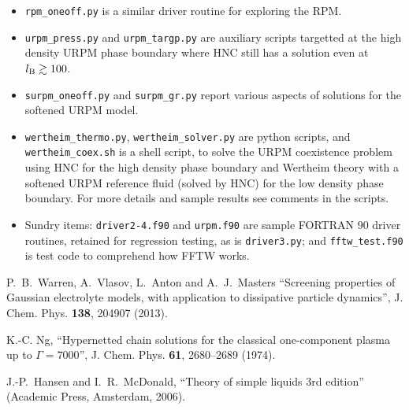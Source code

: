 \documentclass[12pt,a4paper]{article}
\begin{document}
\begin{itemize}
  (URPM) \cite{WVA+13}, including the possibility of a neutral solvent
  species.  The first routine can be used for one-off calculations of
  structure and thermodynamics at a chosen state point.  The second
  routine is intended to scan a range of densities to zero in on the
  Kirkwood transition between pure exponential and damped oscillatory
  behaviour in the tails of the total correlation functions.  Both
  routines are fully provided with command line options and sensible
  defaults, via the \verb+argparse+ module.  To see the available
  options use \verb+--help+.  The option \verb+--ncomp+ selects
  between the pure URPM case (\verb+--ncomp=2+, default) and the
  solvated URPM case (\verb+--ncomp=3+).
%
\item\verb+rpm_oneoff.py+ is a similar driver routine for exploring
  the RPM.
%
\item\verb+urpm_press.py+ and \verb+urpm_targp.py+ are auxiliary
  scripts targetted at the high density URPM phase boundary where HNC
  still has a solution even at $l_{\mathrm{B}}\gtrsim100$.
%
\item\verb+surpm_oneoff.py+ and \verb+surpm_gr.py+ report various
  aspects of solutions for the softened URPM model. 
%
\item\verb+wertheim_thermo.py+, \verb+wertheim_solver.py+ are python
  scripts, and \verb+wertheim_coex.sh+ is a shell script, to solve the
  URPM coexistence problem using HNC for the high density phase
  boundary and Wertheim theory with a softened URPM reference fluid
  (solved by HNC) for the low density phase boundary.  For more
  details and sample results see comments in the scripts.
%
\item Sundry items: \verb+driver2-4.f90+ and \verb+urpm.f90+ are
  sample FORTRAN 90 driver routines, retained for regression testing,
  as is \verb+driver3.py+; and \verb+fftw_test.f90+ is test code to
  comprehend how FFTW works.
%
\end{itemize}

\thebibliography{}

 P.~B.~Warren, A.~Vlasov, L.~Anton and A.~J.~Masters
  ``Screening properties of Gaussian electrolyte models, with
  application to dissipative particle dynamics'',
  J. Chem. Phys. {\bf138}, 204907 (2013).

 K.-C. Ng, ``Hypernetted chain solutions for the
  classical one-component plasma up to $\Gamma=7000$'',
  J. Chem. Phys. {\bf61}, 2680--2689 (1974).

 J.-P.~Hansen and I.~R.~McDonald, ``Theory of simple
  liquids 3rd edition'' (Academic Press, Amsterdam, 2006).
\end{document}
